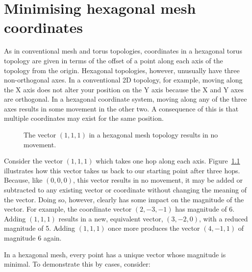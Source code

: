 \chapter{Minimising hexagonal mesh coordinates}
	\label{app:minimal-hex-coordinates}
	
	As in conventional mesh and torus topologies, coordinates in a hexagonal
	torus topology are given in terms of the offset of a point along each axis of
	the topology from the origin. Hexagonal topologies, however, unusually have
	three non-orthogonal axes. In a conventional 2D topology, for example, moving
	along the X axis does not alter your position on the Y axis because the X and
	Y axes are orthogonal. In a hexagonal coordinate system, moving along any of
	the three axes results in some movement in the other two. A consequence of
	this is that multiple coordinates may exist for the same position.
	
	\begin{figure}
		\center
		\caption[$(1,1,1)$ in a hexagonal mesh or torus.]%
		{The vector $(1, 1, 1)$ in a hexagonal mesh topology results in
		no movement.}
		\label{fig:hex-mesh-loop}
	\end{figure}
	
	Consider the vector $(1,1,1)$ which takes one hop along each axis.
	Figure~\ref{fig:hex-mesh-loop} illustrates how this vector takes us back to
	our starting point after three hops. Because, like $(0,0,0)$, this vector
	results in no movement, it may be added or subtracted to any existing vector
	or coordinate without changing the meaning of the vector. Doing so, however,
	clearly has some impact on the magnitude of the vector. For example, the
	coordinate vector $(2, -3, -1)$ has magnitude of 6. Adding $(1,1,1)$ results
	in a new, equivalent vector, $(3, -2, 0)$, with a reduced magnitude of 5.
	Adding $(1,1,1)$ once more produces the vector $(4, -1, 1)$ of magnitude 6
	again.
	
	In a hexagonal mesh, every point has a unique vector whose magnitude is
	minimal. To demonstrate this by cases, consider:
	
